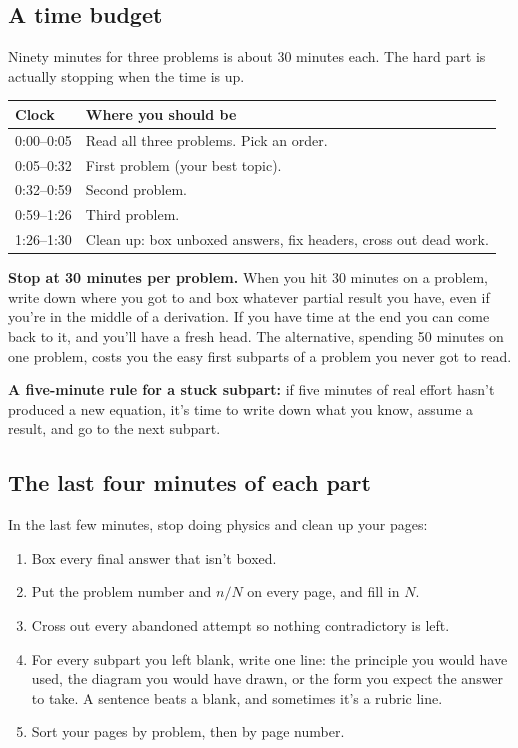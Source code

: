 \documentclass[11pt]{article}
\begin{document}
\subsection*{A time budget}

Ninety minutes for three problems is about 30 minutes each. The hard part is actually
stopping when the time is up.

\begin{center}
\begin{tabular}{ll}
\hline
\textbf{Clock} & \textbf{Where you should be} \\
\hline
0:00--0:05 & Read all three problems. Pick an order. \\
0:05--0:32 & First problem (your best topic). \\
0:32--0:59 & Second problem. \\
0:59--1:26 & Third problem. \\
1:26--1:30 & Clean up: box unboxed answers, fix headers, cross out dead work. \\
\hline
\end{tabular}
\end{center}

\begin{tipbox}
\textbf{Stop at 30 minutes per problem.} When you hit 30 minutes on a problem, write down
where you got to and box whatever partial result you have, even if you're in the middle of
a derivation. If you have time at the end you can come back to it, and you'll have a fresh
head. The alternative, spending 50 minutes on one problem, costs you the easy first
subparts of a problem you never got to read.

\textbf{A five-minute rule for a stuck subpart:} if five minutes of real effort hasn't
produced a new equation, it's time to write down what you know, assume a result, and go to
the next subpart.
\end{tipbox}

\subsection*{The last four minutes of each part}

In the last few minutes, stop doing physics and clean up your pages:

\begin{enumerate}\setlength{\itemsep}{1pt}
\item Box every final answer that isn't boxed.
\item Put the problem number and $n/N$ on every page, and fill in $N$.
\item Cross out every abandoned attempt so nothing contradictory is left.
\item For every subpart you left blank, write one line: the principle you would have used,
the diagram you would have drawn, or the form you expect the answer to take. A sentence
beats a blank, and sometimes it's a rubric line.
\item Sort your pages by problem, then by page number.
\end{enumerate}
\end{document}
